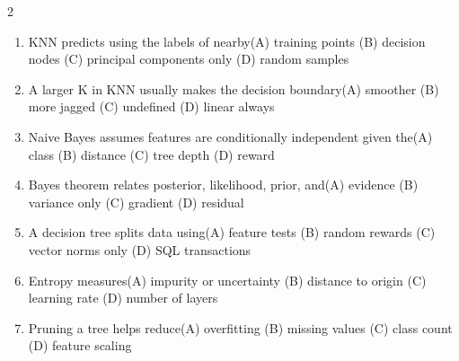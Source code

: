 \documentclass[a4paper]{article}
\begin{document}
\begin{multicols*}{2}
\begin{enumerate}
\item KNN predicts using the labels of nearby\newline\hspace*{0.6em}(A) training points \quad (B) decision nodes \newline\hspace*{0.6em}(C) principal components only \quad (D) random samples
\item A larger K in KNN usually makes the decision boundary\newline\hspace*{0.6em}(A) smoother \quad (B) more jagged \newline\hspace*{0.6em}(C) undefined \quad (D) linear always
\item Naive Bayes assumes features are conditionally independent given the\newline\hspace*{0.6em}(A) class \quad (B) distance \newline\hspace*{0.6em}(C) tree depth \quad (D) reward
\item Bayes theorem relates posterior, likelihood, prior, and\newline\hspace*{0.6em}(A) evidence \quad (B) variance only \newline\hspace*{0.6em}(C) gradient \quad (D) residual
\item A decision tree splits data using\newline\hspace*{0.6em}(A) feature tests \quad (B) random rewards \newline\hspace*{0.6em}(C) vector norms only \quad (D) SQL transactions
\item Entropy measures\newline\hspace*{0.6em}(A) impurity or uncertainty \quad (B) distance to origin \newline\hspace*{0.6em}(C) learning rate \quad (D) number of layers
\item Pruning a tree helps reduce\newline\hspace*{0.6em}(A) overfitting \quad (B) missing values \newline\hspace*{0.6em}(C) class count \quad (D) feature scaling

\end{enumerate}
\end{multicols*}
\end{document}
